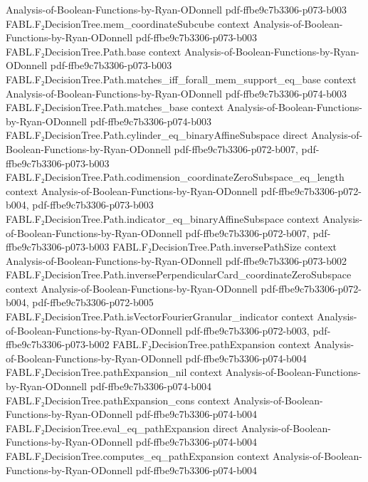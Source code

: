 \begin{theorem}
  {Analysis-of-Boolean-Functions-by-Ryan-ODonnell}
  {pdf-ffbe9c7b3306-p073-b003}
\proofstep
  {FABL.F₂DecisionTree.mem_coordinateSubcube}
  {context}
  {Analysis-of-Boolean-Functions-by-Ryan-ODonnell}
  {pdf-ffbe9c7b3306-p073-b003}
\proofstep
  {FABL.F₂DecisionTree.Path.base}
  {context}
  {Analysis-of-Boolean-Functions-by-Ryan-ODonnell}
  {pdf-ffbe9c7b3306-p073-b003}
\proofstep
  {FABL.F₂DecisionTree.Path.matches_iff_forall_mem_support_eq_base}
  {context}
  {Analysis-of-Boolean-Functions-by-Ryan-ODonnell}
  {pdf-ffbe9c7b3306-p074-b003}
\proofstep
  {FABL.F₂DecisionTree.Path.matches_base}
  {context}
  {Analysis-of-Boolean-Functions-by-Ryan-ODonnell}
  {pdf-ffbe9c7b3306-p074-b003}
\proofstep
  {FABL.F₂DecisionTree.Path.cylinder_eq_binaryAffineSubspace}
  {direct}
  {Analysis-of-Boolean-Functions-by-Ryan-ODonnell}
  {pdf-ffbe9c7b3306-p072-b007,
    pdf-ffbe9c7b3306-p073-b003}
\proofstep
  {FABL.F₂DecisionTree.Path.codimension_coordinateZeroSubspace_eq_length}
  {context}
  {Analysis-of-Boolean-Functions-by-Ryan-ODonnell}
  {pdf-ffbe9c7b3306-p072-b004,
    pdf-ffbe9c7b3306-p073-b003}
\proofstep
  {FABL.F₂DecisionTree.Path.indicator_eq_binaryAffineSubspace}
  {context}
  {Analysis-of-Boolean-Functions-by-Ryan-ODonnell}
  {pdf-ffbe9c7b3306-p072-b007,
    pdf-ffbe9c7b3306-p073-b003}
\proofstep
  {FABL.F₂DecisionTree.Path.inversePathSize}
  {context}
  {Analysis-of-Boolean-Functions-by-Ryan-ODonnell}
  {pdf-ffbe9c7b3306-p073-b002}
\proofstep
  {FABL.F₂DecisionTree.Path.inversePerpendicularCard_coordinateZeroSubspace}
  {context}
  {Analysis-of-Boolean-Functions-by-Ryan-ODonnell}
  {pdf-ffbe9c7b3306-p072-b004,
    pdf-ffbe9c7b3306-p072-b005}
\proofstep
  {FABL.F₂DecisionTree.Path.isVectorFourierGranular_indicator}
  {context}
  {Analysis-of-Boolean-Functions-by-Ryan-ODonnell}
  {pdf-ffbe9c7b3306-p072-b003,
    pdf-ffbe9c7b3306-p073-b002}
\proofstep
  {FABL.F₂DecisionTree.pathExpansion}
  {context}
  {Analysis-of-Boolean-Functions-by-Ryan-ODonnell}
  {pdf-ffbe9c7b3306-p074-b004}
\proofstep
  {FABL.F₂DecisionTree.pathExpansion_nil}
  {context}
  {Analysis-of-Boolean-Functions-by-Ryan-ODonnell}
  {pdf-ffbe9c7b3306-p074-b004}
\proofstep
  {FABL.F₂DecisionTree.pathExpansion_cons}
  {context}
  {Analysis-of-Boolean-Functions-by-Ryan-ODonnell}
  {pdf-ffbe9c7b3306-p074-b004}
\proofstep
  {FABL.F₂DecisionTree.eval_eq_pathExpansion}
  {direct}
  {Analysis-of-Boolean-Functions-by-Ryan-ODonnell}
  {pdf-ffbe9c7b3306-p074-b004}
\proofstep
  {FABL.F₂DecisionTree.computes_eq_pathExpansion}
  {context}
  {Analysis-of-Boolean-Functions-by-Ryan-ODonnell}
  {pdf-ffbe9c7b3306-p074-b004}

\end{theorem}
